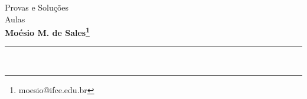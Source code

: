 \documentclass[13pt,a4paper]{article}
\makeatletter
\newcommand{\nome}{\bf Moésio M. de Sales\footnote{moesio@ifce.edu.br}}
\newcommand{\titu}{Provas e Soluções}
\newcommand{\disc}{Aulas}
\makeatother
\begin{document}
{\Large
\begin{center} \titu\\ \disc\\  \nome\end{center}
}
\hfill   %
\hrule\ 



\printbibliography
\listoftodos[Notes]
\end{document}
